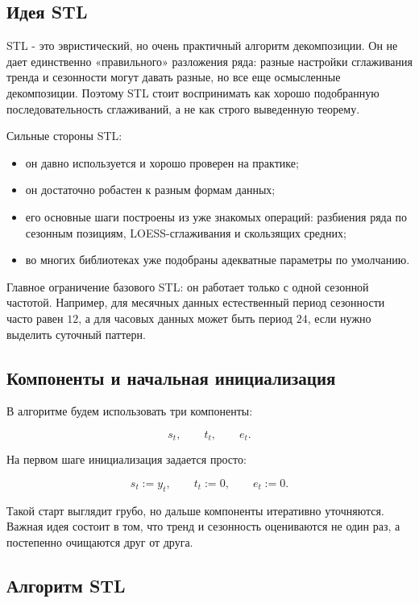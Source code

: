 \documentclass[12pt,fleqn]{article}
\begin{document}
\subsection{Идея STL}


STL - это эвристический, но очень практичный алгоритм декомпозиции.
Он не дает единственно «правильного» разложения ряда: разные настройки сглаживания тренда и сезонности могут давать разные, но все еще осмысленные декомпозиции.
Поэтому STL стоит воспринимать как хорошо подобранную последовательность сглаживаний, а не как строго выведенную теорему.

Сильные стороны STL:

\begin{itemize}
  \item он давно используется и хорошо проверен на практике;
  \item он достаточно робастен к разным формам данных;
  \item его основные шаги построены из уже знакомых операций: разбиения ряда по сезонным позициям, LOESS-сглаживания и скользящих средних;
  \item во многих библиотеках уже подобраны адекватные параметры по умолчанию.
\end{itemize}

Главное ограничение базового STL: он работает только с одной сезонной частотой.
Например, для месячных данных естественный период сезонности часто равен \(12\), а для часовых данных может быть период \(24\), если нужно выделить суточный паттерн.


\subsection{Компоненты и начальная инициализация}


В алгоритме будем использовать три компоненты:

\[
s_t,\qquad
t_t,\qquad
e_t.
\]

На первом шаге инициализация задается просто:

\[
s_t := y_t,\qquad
t_t := 0,\qquad
e_t := 0.
\]

Такой старт выглядит грубо, но дальше компоненты итеративно уточняются.
Важная идея состоит в том, что тренд и сезонность оцениваются не один раз, а постепенно очищаются друг от друга.


\subsection{Алгоритм STL}
\end{document}
